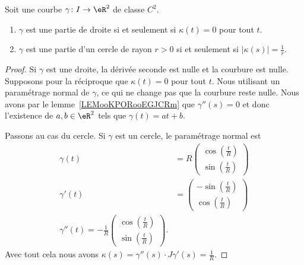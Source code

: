 \begin{theorem}     \label{THOooDLDVooFQnLWn}
	Soit une courbe \( \gamma\colon I\to \eR^2\) de classe \( C^2\).
	\begin{enumerate}
		\item
		      \( \gamma\) est une partie de droite si et seulement si \( \kappa(t)=0\) pour tout \( t\).
		\item
		      \( \gamma\) est une partie d'un cercle de rayon \( r>0\) si et seulement si \( | \kappa(s) |=\frac{1}{ r }\).
	\end{enumerate}
\end{theorem}

\begin{proof}
	Si \( \gamma\) est une droite, la dérivée seconde est nulle et la courbure est nulle. Supposons pour la réciproque que \( \kappa(t)=0\) pour tout \( t\). Nous utilisant un paramétrage normal de \( \gamma\), ce qui ne change pas que la courbure reste nulle. Nous avons par le lemme~\ref{LEMooKPORooEGJCRm} que \( \gamma''(s)=0\) et donc l'existence de \( a,b\in \eR^2\) tels que \( \gamma(t)=at+b\).

	Passons au cas du cercle. Si \( \gamma\) est un cercle, le paramétrage normal est
	\begin{subequations}
		\begin{align}
			\gamma(t)  & =R\begin{pmatrix}
				\cos(\frac{ t }{ R }) \\
				\sin(\frac{ t }{ R })
			\end{pmatrix} \\
			\gamma'(t) & =\begin{pmatrix}
				-\sin(\frac{ t }{ R }) \\
				\cos(\frac{ t }{ R })
			\end{pmatrix}  \\
			\gamma''(t)=-\frac{1}{ R }\begin{pmatrix}
				\cos(\frac{ t }{ R }) \\
				\sin(\frac{ t }{ R })
			\end{pmatrix}.
		\end{align}
	\end{subequations}
	Avec tout cela nous avons \( \kappa(s)=\gamma''(s)\cdot J\gamma'(s)=\frac{1}{ R }\).


\end{proof}
